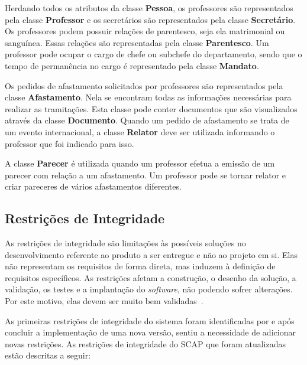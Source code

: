 Herdando todos os atributos da classe \textbf{Pessoa}, os professores são representados pela classe \textbf{Professor} e os secretários são representados pela classe \textbf{Secretário}. Os professores podem possuir relações de parentesco, seja ela matrimonial ou sanguínea. Essas relações são representadas pela classe \textbf{Parentesco}. Um professor pode ocupar o cargo de chefe ou subchefe do departamento, sendo que o tempo de permanência no cargo é representado pela classe \textbf{Mandato}.

Os pedidos de afastamento solicitados por professores são representados pela classe \textbf{Afastamento}. Nela se encontram todas as informações necessárias para realizar as tramitações. Esta classe pode conter documentos que são visualizados através da classe \textbf{Documento}. Quando um pedido de afastamento se trata de um evento internacional, a classe \textbf{Relator} deve ser utilizada informando o professor que foi indicado para isso.

A classe \textbf{Parecer} é utilizada quando um professor efetua a emissão de um parecer com relação a um afastamento. Um professor pode se tornar relator e criar pareceres de vários afastamentos diferentes. 

\subsection{Restrições de Integridade}
\label{sec-requisitos-restricoes-integridade}

As restrições de integridade são limitações às possíveis soluções no desenvolvimento referente ao produto a ser entregue e não ao projeto em si. Elas não representam os requisitos de forma direta, mas induzem à definição de requisitos específicos. As restrições afetam a construção, o desenho da solução, a validação, os testes e a implantação do \textit{software}, não podendo sofrer alterações. Por este motivo, elas devem ser muito bem validadas~\cite{vazquez-et-al:erson16}.

As primeiras restrições de integridade do sistema foram identificadas por  e após concluir a implementação de uma nova versão,  sentiu a necessidade de adicionar novas restrições. As restrições de integridade do SCAP que foram atualizadas estão descritas a seguir:
 
